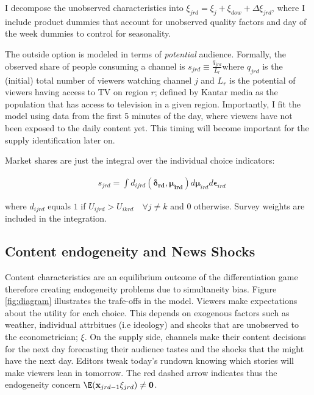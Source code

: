 \documentclass[12pt]{article}
\begin{document}
	
	
	I decompose the unobserved characteristics into $\xi_{jrd}= \xi_j + \xi_{dow} + \Delta \xi_{jrd}$, where I include product dummies that account for unobserved quality factors and day of the week dummies to control for  seasonality. 
	
	The outside option is modeled in terms of \textit{potential} audience. Formally, the observed share of people consuming a channel  is $ s_{jrd}\equiv \frac{q_{jrd}}{L_{r}}$where $ q_{jrd} $ is the (initial) total number of viewers watching channel $ j $ and  $ L_{r} $ is the potential of viewers having access to TV on region $ r$; defined by Kantar media as the population that has access to television in a given region. Importantly, I fit the model using data from the first 5 minutes of the day, where viewers have not been exposed to the daily content yet. This timing will become important for the supply identification later on. 
	
	Market shares are just the integral over the individual choice indicators:  
	
	
	\begin{equation}\label{eq:shares}
	\begin{aligned}
		& s_{jrd} = \int d_{ijrd}(\bm{\delta_{rd}},\bm{\mu_{ird}})d\bm{\mu}_{ird}d\bm{\epsilon}_{ird}
	\end{aligned} 
\end{equation} 
	
	where $d_{ijrd}$ equals $1$ if $U_{ijrd}>U_{ikrd} \quad \forall j\neq k$ and $0$ otherwise. Survey weights are included in the integration. 

	
	\subsection{Content endogeneity and News Shocks} \label{section:endogeneity}
	
	
	Content characteristics are an equilibrium outcome of the differentiation game therefore creating endogeneity problems due to simultaneity bias.  Figure \ref{fig:diagram} illustrates the trafe-offs in the model. Viewers make expectations about the utility for each choice. This depends on exogenous factors such as weather, individual attrbitues (i.e ideology) and shcoks that are unobserved to the econometrician; $ \xi$.  On the supply side, channels make their content decisions for the next day forecasting their audience tastes and the shocks that the might have the next day. Editors tweak today’s rundown knowing which stories will make viewers lean in tomorrow. The red dashed arrow indicates thus the endogeneity concern $\E(\mathbf{x}_{jrd-1}\xi_{jrd})\neq \mathbf{0} $.
	
\end{document}
